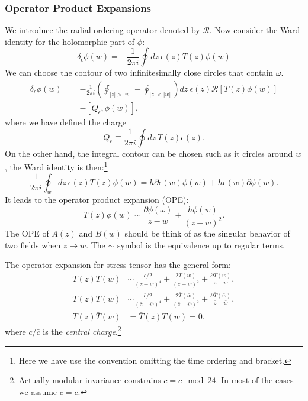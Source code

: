 \documentclass[aps,prb,superscriptaddress,nofootinbib]{revtex4}
\begin{document}
\subsubsection{Operator Product Expansions}
We introduce the radial ordering operator denoted by $\mathcal R$.
Now consider the Ward identity for the holomorphic part of $\phi$:
\begin{equation}
	\delta_{\epsilon}\phi(w) = -\frac{1}{2\pi i}\oint dz\ \epsilon(z) T(z) \phi(w)
\end{equation}
We can choose the contour of two infinitesimally close circles that contain $\omega$.
\begin{equation}
\begin{aligned}
	\delta_{\epsilon}\phi(w) 
	&= -\frac{1}{2\pi i} \left(\oint_{|z|>|w|}-\oint_{|z|<|w|}\right) dz\ \epsilon(z) \mathcal R \left[T(z) \phi(w)\right]  \\
	&= -[Q_\epsilon, \phi(w)],
\end{aligned}
\end{equation}
where we have defined the charge
\begin{equation}
	Q_\epsilon \equiv \frac{1}{2\pi i} \oint dz\ T(z) \epsilon(z).
\end{equation}
On the other hand, the integral contour can be chosen such as it circles around $w$, the Ward identity is then:\footnote{Here we have use the convention omitting the time ordering and bracket.}
\begin{equation}
	\frac{1}{2\pi i} \oint_{w} dz\ \epsilon(z)  T(z) \phi(w)
	= h \partial \epsilon(w)\phi(w) + h \epsilon(w) \partial \phi(w).
\end{equation}
It leads to the operator product expansion (OPE):
\begin{equation}
	T(z)\phi(w) \sim \frac{\partial \phi(\omega)}{z-w} + \frac{h\phi(w)}{(z-w)^2}.
\end{equation}
The OPE of $A(z)$ and $B(w)$ should be think of as the singular behavior of two fields when $z\rightarrow w$.
The $\sim$ symbol is the equivalence up to regular terms.

The operator expansion for stress tensor has the general form:
\begin{equation}
\begin{aligned}
	T(z) T(w) &\sim \frac{c/2}{(z-w)^4} + \frac{2T(w)}{(z-w)^2} + \frac{\partial T(w)}{z-w}, \\
	\bar T(\bar z) \bar T(\bar w) &\sim \frac{\bar c/2}{(\bar z-\bar w)^4} + \frac{2\bar T(\bar w)}{(\bar z-\bar w)^2} + \frac{\partial \bar{T}(\bar w)}{\bar z-\bar w}, \\
	T(z) \bar{T}(\bar w) &= \bar{T}(\bar z) T(w) = 0.
\end{aligned}
\end{equation}
where $c/\bar c$ is the \textit{central charge}.\footnote{Actually modular invariance constrains $c = \bar c \mod 24$. In most of the cases we assume $c=\bar c$.}
\end{document}
